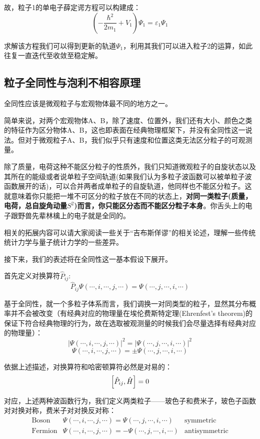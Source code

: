 故，粒子1的单电子薛定谔方程可以构建成：
\[\left ( -\frac{\hbar^2}{2m_1}+V_1 \right ) \varPsi_1=\varepsilon_1\varPsi_1\]

求解该方程我们可以得到更新的轨道$\varPsi_1$，利用其我们可以进入粒子2的运算，如此往复一直迭代至收敛至稳定解。

\subsection{粒子全同性与泡利不相容原理}
全同性应该是微观粒子与宏观物体最不同的地方之一。

简单来说，对两个宏观物体A、B，除了速度、位置外，我们还有大小、颜色之类的特征作为区分物体A、B，这也即表面在经典物理框架下，并没有全同性这一说法。但对于微观粒子A、B，我们似乎只有速度和位置这类无法区分粒子的可观测量。

除了质量，电荷这种不能区分粒子的性质外，我们只知道微观粒子的自旋状态以及其所在的能级或者说单粒子空间轨道(如果我们认为多粒子波函数可以被单粒子波函数展开的话)，可以合并两者成单粒子的自旋轨道，他同样也不能区分粒子。这就意味着你只能把一堆不可区分的粒子放在不同的状态上，\textbf{对同一类粒子(质量，电荷，总自旋角动量$S^2$)而言，你只能区分态而不能区分粒子本身}。你舌头上的电子跟野兽先辈林檎上的电子就是全同的。

相关的拓展内容可以请大家阅读一些关于“吉布斯佯谬”的相关论述，理解一些传统统计力学与量子统计力学的一些差异。

接下来，我们的表述将在全同性这一基本假设下展开。

首先定义对换算符$\hat{P}_{ij}$:
\[\hat{P}_{ij}\varPsi(\cdots,i,\cdots,j,\cdots)=\varPsi(\cdots,j,\cdots,i,\cdots)\]

基于全同性，就一个多粒子体系而言，我们调换一对同类型的粒子，显然其分布概率并不会被改变（有经典对应的物理量在埃伦费斯特定理(Ehrenfest's theorem)的保证下符合经典物理的行为，故在选取被观测量的时候我们会尽量选择有经典对应的物理量）：
\[|\varPsi(\cdots,i,\cdots,j,\cdots)|^2=|\varPsi(\cdots,j,\cdots,i,\cdots)|^2\]
\[\varPsi(\cdots,i,\cdots,j,\cdots)=\pm\varPsi(\cdots,j,\cdots,i,\cdots)\]

依据上述描述，对换算符和哈密顿算符必然是对易的：
\[\qty[\hat{P}_{ij},\hat{H}]=0\]

对应，上述两种波函数行为，我们定义两类粒子——玻色子和费米子，玻色子函数对对换对称，费米子对对换反对称：
\[
    \begin{array}{lll}
        \text{Boson} & \varPsi(\cdots,i,\cdots,j,\cdots)=\varPsi(\cdots,j,\cdots,i,\cdots) & \text{symmetric} \\
        \text{Fermion} & \varPsi(\cdots,i,\cdots,j,\cdots)=-\varPsi(\cdots,j,\cdots,i,\cdots) & \text{antisymmetric}
    \end{array}
\]

